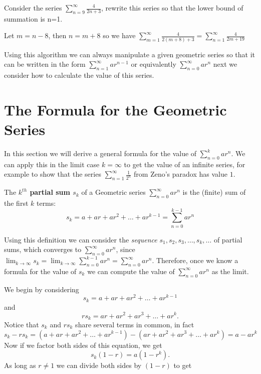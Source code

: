 \begin{Example}
Consider the series $\displaystyle{\sum_{n=9}^{\infty}
\frac{4}{2n+3}} $, rewrite
this series so that the lower bound of summation is n=1.

\solution
Let $m=n-8$, then $n=m+8$ so we have
$\displaystyle{\sum_{m=1}^{\infty} \frac{4}{2(m+8)+3} =
\sum_{n=1}^{\infty} \frac{4}{2m+19}}$
\end{Example}

Using this algorithm we can always manipulate a given geometric
series so that it can be written in the form
$\displaystyle{\sum_{n=1}^{\infty} ar^{n-1}}$ or equivalently
$\displaystyle{\sum_{n=0}^{\infty} ar^n}$ next we consider how to
calculate the value of this series.

\section*{The Formula for the Geometric Series}
In this section we will derive a general formula for the value of
$\displaystyle{ \sum_{n=0}^{k} ar^{n}}$. We can apply this in the
limit case $k=\infty$ to get the value of an infinite series, for
example to show that the series $\displaystyle{\sum_{n=1}^{\infty}
\frac{1}{2^n}}$ from Zeno's paradox has value $1$.

\begin{Definition}
The \textbf{ $k^{th}$ partial sum $s_{k}$} of a Geometric series
$\displaystyle{\sum_{n=0}^{\infty} ar^{n}}$ is the (finite) sum of
the first $k$ terms:
\[
s_{k} = a + ar + ar^{2} + \ldots + ar^{k-1} =
\sum_{n=0}^{k-1} ar^{n}
\]
\end{Definition}
Using this definition we can consider the {\em sequence} $s_{1},
s_{2}, s_{3}, \ldots , s_{k}, \ldots $ of partial sums,  which
converges to $\displaystyle{\sum_{n=0}^{\infty} ar^{n}}$, since
$\displaystyle{\lim_{k \rightarrow \infty} s_{k} = \lim_{k
\rightarrow \infty} \sum_{n=0}^{k-1} ar^{n} = \sum_{n=0}^{\infty}
ar^{n}}$. Therefore, once we know a formula for the value of $s_{k}$
we can compute the value of $\displaystyle{\sum_{n=0}^{\infty}
ar^{n}}$ as the limit.

We begin by considering
\[
s_{k}=a + ar + ar^{2} + \ldots + ar^{k-1}
\]
and
\[
rs_{k} = ar + ar^{2} + ar^{3} + \ldots + ar^{k}.
\]
Notice that $s_{k}$ and $rs_{k}$ share several terms in common, in
fact
\[
s_{k}-rs_{k}= (a + ar + ar^{2} + \ldots + ar^{k-1}) - (ar +
ar^{2} + ar^{3} + \ldots + ar^{k}) = a -ar^{k}
\]
Now if we factor both sides of this equation, we get
\[
s_{k}(1-r)=a(1-r^{k}).
\]
As
long as $r \neq 1$ we can divide both sides by $(1-r)$ to get
\begin{center}
\fbox{\begin{minipage}{3in}
\Large
\[
s_{k}=\sum_{n=0}^{k-1}ar^n=a\frac{1-r^{k}}{1-r}.
\]
\end{minipage}}
\end{center}

